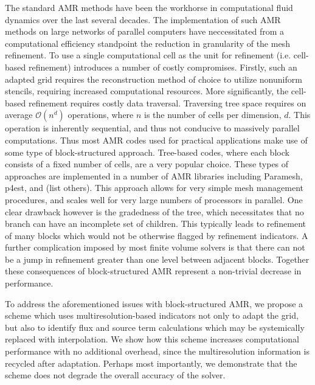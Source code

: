 \documentclass[]{article}
\begin{document}
    The standard AMR methods have been the workhorse in computational fluid
    dynamics over the last several decades. The implementation of such AMR
    methods on large networks of parallel computers have neccessitated from a
    computational efficiency standpoint the reduction in granularity of the
    mesh refinement. To use a single computational cell as the unit for
    refinement (i.e. cell-based refinement) introduces a number of costly
    compromises. Firstly, such an adapted grid requires the reconstruction
    method of choice to utilize nonuniform stencils, requiring increased
    computational resources. More significantly, the cell-based refinement
    requires costly data traversal. Traversing tree space requires on average
    $\mathcal{O}(n^d)$ operations, where $n$ is the number of cells per
    dimension, $d$. This operation is inherently sequential, and thus not
    conducive to massively parallel computations. Thus most AMR codes used for
    practical applications make use of some type of block-structured approach.
    Tree-based codes, where each block consists of a fixed number of cells, are
    a very popular choice. These types of approaches are implemented in a
    number of AMR libraries including Paramesh, p4est, and (list others). This
    approach allows for very simple mesh management procedures, and scales well
    for very large numbers of processors in parallel.  One clear drawback
    however is the gradedness of the tree, which necessitates that no branch
    can have an incomplete set of children.  This typically leads to refinement
    of many blocks which would not be otherwise flagged by refinement
    indicators. A further complication imposed by most finite volume solvers is
    that there can not be a jump in refinement greater than one level between
    adjacent blocks. Together these consequences of block-structured AMR
    represent a non-trivial decrease in performance.

    To address the aforementioned issues with block-structured AMR, we propose
    a scheme which uses multiresolution-based indicators not only to adapt the
    grid, but also to identify flux and source term calculations which may be
    systemically replaced with interpolation.  We show how this scheme
    increases computational performance with no additional overhead, since the
    multiresolution information is recycled after adaptation. Perhaps most
    importantly, we demonstrate that the scheme does not degrade the overall
    accuracy of the solver.
\end{document}
